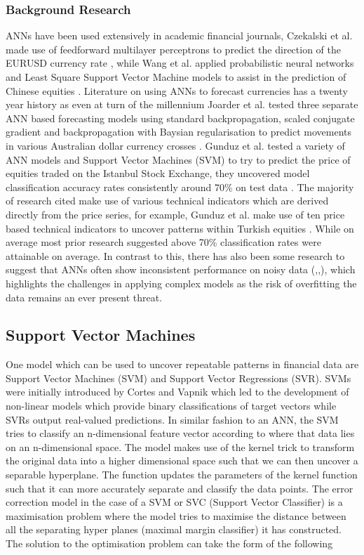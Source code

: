 \documentclass[11pt]{article}
\begin{document}
\subsubsection{Background Research}
ANNs have been used extensively in academic financial journals, Czekalski et al. made use of feedforward multilayer perceptrons to predict the direction of the EURUSD currency rate \cite{Czekalski2015}, while Wang et al. applied probabilistic neural networks and  Least Square Support Vector Machine models to assist in the prediction of Chinese equities \cite{Wang2014} . Literature on using ANNs to forecast currencies has a twenty year history as even at turn of the millennium Joarder et al.  tested three separate ANN based forecasting models using standard backpropagation, scaled conjugate gradient and backpropagation with Baysian regularisation to predict movements in various Australian dollar currency crosses \cite{Joarder2003}. Gunduz et al. tested a variety of ANN models and Support Vector Machines (SVM) to try to predict the price of equities traded on the Istanbul Stock Exchange, they uncovered model classification accuracy rates consistently around 70\% on test data \cite{Gunduz2017} . \newline The majority of research cited make use of various technical indicators which are derived directly from the price series, for example, Gunduz et al. make use of ten price based technical indicators to uncover patterns within Turkish equities \cite{Gunduz2017}. While on average most prior research suggested above 70\% classification rates were attainable on average. In contrast to this, there has also been some research to suggest that ANNs often show inconsistent performance on noisy data (\cite{Kim2003},\cite{Kumar2006},\cite{Kim2000}), which highlights the challenges in applying complex models as the risk of overfitting the data remains an ever present threat. 

\subsection{Support Vector Machines}
One model which can be used to uncover repeatable patterns in financial data are Support Vector Machines (SVM) and Support Vector Regressions (SVR). SVMs were initially introduced by Cortes and Vapnik \cite{Cortes1995} which led to the development of non-linear models which provide binary classifications of target vectors while SVRs output real-valued predictions. In similar fashion to an ANN, the SVM tries to classify an n-dimensional feature vector according to where that data lies on an n-dimensional space.
\newline The model makes use of the kernel trick \cite{kerneltrick} to transform the original data into a higher dimensional space such that we can then uncover a separable hyperplane. The function updates the parameters of the kernel function such that it can more accurately separate and classify the data points. The error correction model in the case of a SVM or SVC (Support Vector Classifier) is a maximisation problem where the model tries to maximise the distance between all the separating hyper planes (maximal margin classifier) it has constructed.  The solution to the optimisation problem can take the form of the following
\end{document}
